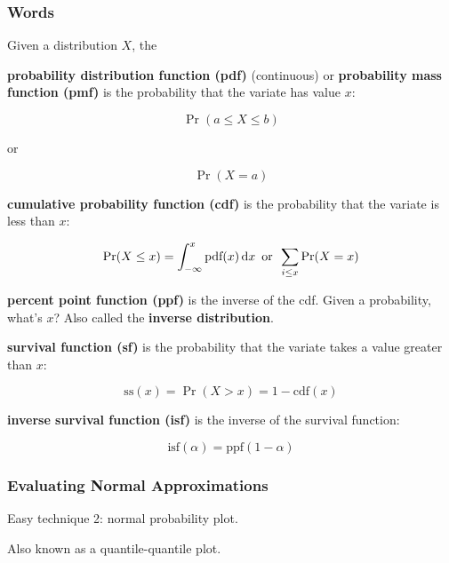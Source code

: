 \begin{frame}
  \frametitle{Words}

  Given a distribution $X$, the

   {
    \textbf{probability distribution function (pdf)} (continuous) or
    \textbf{probability mass function (pmf)} is the probability that
    the variate has value $x$:
    
    \begin{displaymath}
      \Pr(a\le X \le b)
    \end{displaymath}
    \centerline{or}
    \begin{displaymath}
      \Pr(X=a)
    \end{displaymath}
  }
  
   {
    \textbf{cumulative probability function (cdf)} is the probability
    that the variate is less than $x$:

    \begin{displaymath}
      \Pr(X\le x) = \int_{-\infty}^x \text{pdf}(x) \,\mathrm{d}{x} \,\text{ or }\, \sum_{i\le x} \Pr(X = x)
    \end{displaymath}
  }
  
   {
    \textbf{percent point function (ppf)} is the inverse of the cdf.
    Given a probability, what's $x$?
    Also called the \textbf{inverse distribution}.
  }
  
   {
    \textbf{survival function (sf)} is the probability that the
    variate takes a value greater than $x$:

    \begin{displaymath}
      \text{ss}(x) = \Pr(X > x) = 1-\text{cdf}(x)
    \end{displaymath}
  }
  
   {
    \textbf{inverse survival function (isf)} is the inverse of the
    survival function:

    \begin{displaymath}
      \text{isf}(\alpha) = \text{ppf}(1-\alpha)
    \end{displaymath}
  }
\end{frame}

\begin{frame}
\end{frame}

\begin{frame}
  \frametitle{Evaluating Normal Approximations}


   {Easy technique 2: normal probability plot.


    \vspace{-7mm}
    Also known as a quantile-quantile plot.
  }
\end{frame}

